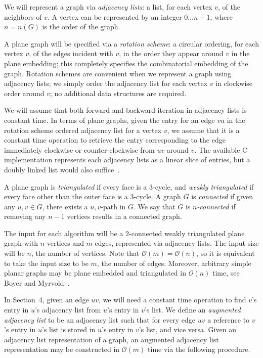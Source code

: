 \documentclass[12pt,letterpaper]{article}
\theoremstyle{plain}
\theoremstyle{definition}
\theoremstyle{break}
\newcommand{\defterm}[1]{\emph{#1}} %
\begin{document}
We will represent a graph via \textit{adjacency lists}:
a list, for each vertex $v$, of the neighbors of $v$.
A vertex can be represented by an integer $0\dots n-1$,
where $n=n(G)$ is the order of the graph.

A plane graph will be specified via
a \defterm{rotation scheme}:
a circular ordering,
for each vertex $v$, of the edges incident with $v$,
in the order they appear around $v$ in the plane embedding;
this completely specifies
the combinatorial embedding of the graph.
Rotation schemes are convenient when we represent a graph
using adjacency lists;
we simply order the adjacency
list for each vertex $v$ in clockwise order around $v$;
no additional data structures are required.

We will assume that both forward and backward iteration in adjacency lists
is constant time. In terms of plane graphs, given the entry for an edge $vu$
in the rotation scheme ordered adjacency list for a vertex $v$, we assume that it is a
constant time operation to retrieve the entry corresponding to the
edge immediately clockwise or counter-clockwise from $uv$ around $v$. The
available C implementation represents each adjacency lists as a linear slice
of entries, but a doubly linked list would also suffice~\cite{Bro2017}.

A plane graph is \defterm{triangulated} if every face is a $3$-cycle, and
\defterm{weakly triangulated} if every face other than the
outer face is a $3$-cycle.
A graph $G$ is \defterm{connected} if given any $u,v\in G$, there exists a $u,v$-path in $G$.
We say that $G$ is \defterm{$n$-connected} if removing any $n-1$ vertices results in a
connected graph.

The input for each algorithm will be a $2$-connected
weakly triangulated plane graph with $n$ vertices and $m$ edges, represented
via adjacency lists. The input size will be $n$, the number of vertices. Note
that $\mathcal{O}(m)=\mathcal{O}(n)$, so it is equivalent to take the input size
to be $m$, the number of edges. Moreover, arbitrary simple planar graphs may be
plane embedded and triangulated in $\mathcal{O}(n)$ time, see Boyer and
Myrvold~\cite{BoMy2004}.

In Section~4, given an edge $uv$, we will need a constant time operation to
find $v$'s entry in $u$'s adjacency list from $u$'s entry in $v$'s list.
We define an \defterm{augmented adjacency list} to be an adjacency list such
that for
every edge $uv$ a reference to $v$'s entry in
$u$'s list is stored in $u$'s entry in $v$'s list, and vice versa. Given an
adjacency list representation of a graph, an augmented
adjacency list representation may be constructed in $\mathcal{O}(m)$ time via
the following procedure.
\end{document}
